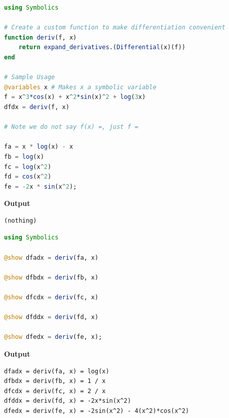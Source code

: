 \begin{lstlisting}[language=Julia,style=mystyle]
using Symbolics 

# Create a custom function to make differentiation convenient
function deriv(f, x)
    return expand_derivatives.(Differential(x)(f))
end

# Sample Usage
@variables x # Makes x a symbolic variable
f = x^3*cos(x) + x^2*sin(x)^2 + log(3x) 
dfdx = deriv(f, x)

# Note we do not say f(x) =, just f = 

fa = x * log(x) - x
fb = log(x)
fc = log(x^2)
fd = cos(x^2)
fe = -2x * sin(x^2);
\end{lstlisting}
\textbf{Output} 
\begin{verbatim}
(nothing)
\end{verbatim}

\bigskip

\begin{lstlisting}[language=Julia,style=mystyle]
using Symbolics 

@show dfadx = deriv(fa, x)

@show dfbdx = deriv(fb, x)

@show dfcdx = deriv(fc, x)

@show dfddx = deriv(fd, x)

@show dfedx = deriv(fe, x);
\end{lstlisting}
\textbf{Output} 
\begin{verbatim}
dfadx = deriv(fa, x) = log(x)
dfbdx = deriv(fb, x) = 1 / x
dfcdx = deriv(fc, x) = 2 / x
dfddx = deriv(fd, x) = -2x*sin(x^2)
dfedx = deriv(fe, x) = -2sin(x^2) - 4(x^2)*cos(x^2)
\end{verbatim}

\Qed

\begin{center}
\setlength{\fboxrule}{2pt}  %
\end{center}

\bigskip

